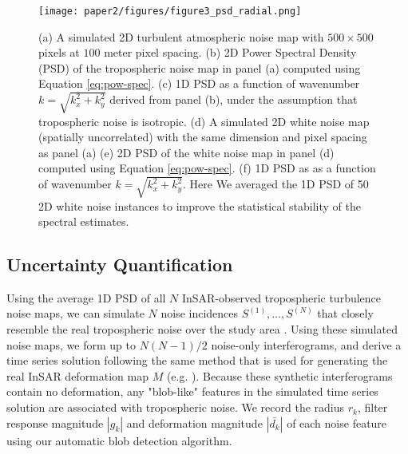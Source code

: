 \documentclass{utexasthesis}
\begin{document}


\begin{figure}[hbt!]
\centering 
\texttt{[image: paper2/figures/figure3\_psd\_radial.png]}
\caption{
(a) A simulated 2D turbulent atmospheric noise map with $ 500 \times 500 $ pixels at $100$ meter pixel spacing.
(b) 2D Power Spectral Density (PSD) of the tropospheric noise map in panel (a) computed using Equation \eqref{eq:pow-spec}.
(c) 1D PSD as a function of wavenumber $k = \sqrt{k_x^2 + k_y^2}$ derived from panel (b), under the assumption that tropospheric noise is isotropic.
(d) A simulated 2D white noise map (spatially uncorrelated) with the same dimension and pixel spacing as panel (a)
(e) 2D PSD of the white noise map in panel (d) computed using Equation \eqref{eq:pow-spec}.
(f) 1D PSD as as a function of wavenumber $k = \sqrt{k_x^2 + k_y^2}$. Here We averaged the 1D PSD of 50  2D white noise instances to improve the statistical stability of the spectral estimates.
}
\label{fig:psd-example}
\end{figure}



\subsection{Uncertainty Quantification}
\label{subsec:methods-3-noise-sim}

Using the average 1D PSD of all $N$ InSAR-observed tropospheric turbulence noise maps, we can simulate $N$ noise incidences  $S^{(1)},\dots, S^{(N)} $ that closely resemble the real tropospheric noise over the study area \cite{Hanssen2001RadarInterferometryData}. Using these simulated noise maps, we form up to $N(N-1)/2$ noise-only interferograms, and derive a time series solution following the same method that is used for generating the real InSAR deformation map $M$ (e.g. \cite{Sandwell1998PhaseGradientApproach, Berardino2002NewAlgorithmSurface}). Because these synthetic interferograms contain no deformation, any "blob-like" features in the simulated time series solution are associated with tropospheric noise. We record the radius $r_k$,  filter response magnitude $|g_k|$ and deformation magnitude $|\bar{d_k}|$ of each noise feature using our automatic blob detection algorithm.
\end{document}
